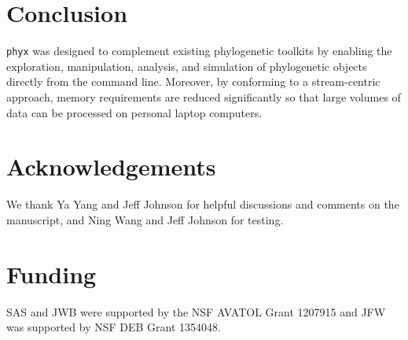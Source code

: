 \documentclass{bioinfo}
\begin{document}
\section{Conclusion}

\texttt{phyx} was designed to complement existing phylogenetic toolkits by
enabling the exploration, manipulation, analysis, and simulation of
phylogenetic objects directly from the command line. Moreover, by conforming
to a stream-centric approach, memory requirements are reduced significantly so that large volumes of data can be processed on personal laptop
computers. \vspace*{-10pt}

\section*{Acknowledgements}

We thank Ya Yang and Jeff Johnson for helpful discussions and comments on the manuscript, and Ning Wang and Jeff Johnson for testing.\vspace*{-12pt}

\section*{Funding}

SAS and JWB were supported by the NSF AVATOL Grant 1207915 and JFW was supported by NSF DEB Grant 1354048. \vspace*{-12pt}


%
%
%
%
%
%

\end{document}
